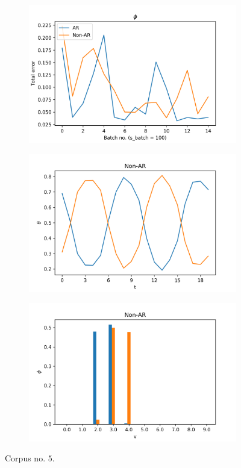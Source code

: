 \documentclass[12pt]{article}
\begin{document}
\begin{figure}[H]
  \begin{subfigure}[b]{0.3\textwidth}
    \includegraphics[width=\linewidth]{performance_phis_experiment-1|overlapping-yes_dataset-5.png}
  \end{subfigure}%
  \begin{subfigure}[b]{0.3\textwidth}
    \includegraphics[width=\linewidth]{latent_thetas_Non-AR_experiment-1|overlapping-yes_dataset-5.png}
  \end{subfigure}%
  \begin{subfigure}[b]{0.3\textwidth}
    \includegraphics[width=\linewidth]{latent_phis_Non-AR_experiment-1|overlapping-yes_dataset-5.png}
  \end{subfigure}%
  \caption{Corpus no. $5$.}


\end{figure}
\end{document}
